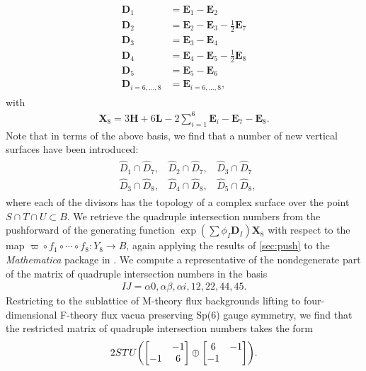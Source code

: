 \documentclass[11pt,oneside,english]{article}
\numberwithin{equation}{section}
\let\originalleft\left
\let\originalright\right
\renewcommand*{\left}{\mathopen{}\mathclose\bgroup\originalleft}
\renewcommand*{\right}{\aftergroup\egroup\originalright}
\theoremstyle{definition}
\begin{document}
	\begin{align}
				\begin{split}
					\boldsymbol{D}_1 &= \boldsymbol{E}_1 - \boldsymbol{E}_2 \\
					\boldsymbol{D}_2 &= \boldsymbol{E}_2 - \boldsymbol{E}_3 - \frac{1}{2} \boldsymbol{E}_7\\
					\boldsymbol{D}_3 &= \boldsymbol{E}_3 - \boldsymbol{E}_4\\
					\boldsymbol{D}_4 &= \boldsymbol{E}_4 - \boldsymbol{E}_5 - \frac{1}{2} \boldsymbol{E}_8\\
					\boldsymbol{D}_5 &= \boldsymbol{E}_5 - \boldsymbol{E}_6 \\
					\boldsymbol{D}_{i = 6,\dots ,8} &= \boldsymbol{E}_{i = 6,\dots,8},
		\end{split}
	\end{align}
with	
	\begin{align}
		\boldsymbol X_8 = 3 \boldsymbol H + 6 \boldsymbol L - 2 \sum_{i=1}^{6} \boldsymbol E_i - \boldsymbol{E}_7 -\boldsymbol{E}_8. 
	\end{align}
Note that in terms of the above basis, we find that a number of new vertical surfaces have been introduced:
	\begin{align}
		\begin{split}
			&\hat D_1\cap  \hat D_7,~~~~ \hat D_2 \cap \hat D_7,~~~~\hat D_3 \cap \hat D_7\\
			&\hat D_3 \cap  \hat D_8,~~~~\hat D_4 \cap \hat D_8,~~~~\hat D_5 \cap \hat D_8,
		\end{split}	
	\end{align}
where each of the divisors has the topology of a complex surface over the point $S\cap T \cap U \subset B$. We retrieve the quadruple intersection numbers from the pushforward of the generating function $\exp(\sum \phi_I \boldsymbol D_I)  \boldsymbol X_8$ with respect to the map $\varpi \circ f_1 \circ \cdots \circ f_8 :Y_8 \rightarrow B$, again applying the results of \cref{sec:push} to the \emph{Mathematica} package in \cite{Jefferson:2022xft}. We compute a representative of the nondegenerate part of the matrix of quadruple intersection numbers in the basis
	\begin{align}
	IJ = \alpha 0, \alpha \beta, \alpha i, 12,22,44,45.
	\end{align}
Restricting to the sublattice of M-theory flux backgrounds lifting to four-dimensional F-theory flux vacua preserving Sp(6) gauge symmetry, we find that the restricted matrix of quadruple intersection numbers takes the form
	\begin{align}
		2 ST U\left( \begin{bmatrix}  &-1 \\ -1 & 6 \end{bmatrix} \oplus \begin{bmatrix} 6 & -1 \\ -1 & \end{bmatrix} \right).
	\end{align}
\end{document}
